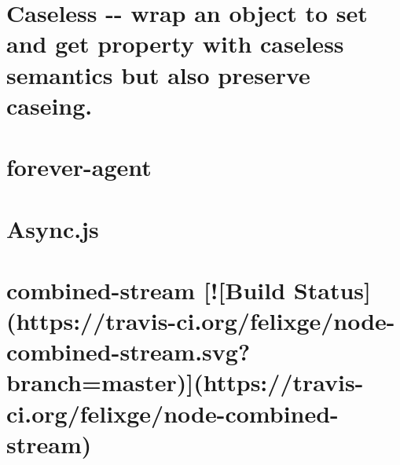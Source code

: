 \documentclass[twoside]{book}
\newcommand{\+}{\discretionary{\mbox{\scriptsize$\hookleftarrow$}}{}{}}
\begin{document}
\chapter{Caseless -\/-\/ wrap an object to set and get property with caseless semantics but also preserve caseing.}
\label{md__c_1__users_martin__documents__git_hub_visual_studio__bachelor__wis_r__wis_r_node_modules_gru893a560a1d5a45ef96e641504f1dbb33}
\hypertarget{md__c_1__users_martin__documents__git_hub_visual_studio__bachelor__wis_r__wis_r_node_modules_gru893a560a1d5a45ef96e641504f1dbb33}{}

\chapter{forever-\/agent}
\label{md__c_1__users_martin__documents__git_hub_visual_studio__bachelor__wis_r__wis_r_node_modules_grue3079bfa49251e8d2ba38369e60284b7}
\hypertarget{md__c_1__users_martin__documents__git_hub_visual_studio__bachelor__wis_r__wis_r_node_modules_grue3079bfa49251e8d2ba38369e60284b7}{}

\chapter{Async.\+js}
\label{md__c_1__users_martin__documents__git_hub_visual_studio__bachelor__wis_r__wis_r_node_modules_gru556798b1feb432e96cfcbb50225b34dd}
\hypertarget{md__c_1__users_martin__documents__git_hub_visual_studio__bachelor__wis_r__wis_r_node_modules_gru556798b1feb432e96cfcbb50225b34dd}{}

\chapter{combined-\/stream \mbox{[}!\mbox{[}Build Status\mbox{]}(https\+://travis-\/ci.org/felixge/node-\/combined-\/stream.svg?branch=master)\mbox{]}(https\+://travis-\/ci.org/felixge/node-\/combined-\/stream)}
\label{md__c_1__users_martin__documents__git_hub_visual_studio__bachelor__wis_r__wis_r_node_modules_gruefda5eb071b1deb24a90e9f641234c8b}
\hypertarget{md__c_1__users_martin__documents__git_hub_visual_studio__bachelor__wis_r__wis_r_node_modules_gruefda5eb071b1deb24a90e9f641234c8b}{}

\end{document}
